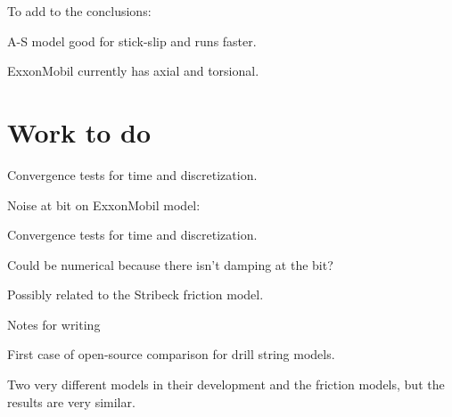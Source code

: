 To add to the conclusions:
\begin{bulletedlist}
	\item A-S model good for stick-slip and runs faster.
	\item ExxonMobil currently has axial and torsional.
\end{bulletedlist}

\section{Work to do}
\begin{bulletedlist}
	\item Convergence tests for time and discretization.
\end{bulletedlist}

\noindent Noise at bit on ExxonMobil model:
\begin{bulletedlist}
	\item Convergence tests for time and discretization.
	\item Could be numerical because there isn't damping at the bit?
	\item Possibly related to the Stribeck friction model.
\end{bulletedlist}

\noindent Notes for writing
\begin{bulletedlist}
	\item First case of open-source comparison for drill string models.
	\item Two very different models in their development and the friction models, but the results are very similar.
\end{bulletedlist}



